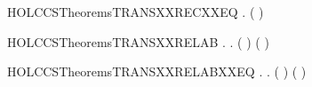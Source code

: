 \newcommand{\HOLCCSTheoremsTRANSXXREC}{\UseVerbatim{HOLCCSTheoremsTRANSXXREC}}
\begin{SaveVerbatim}{HOLCCSTheoremsTRANSXXRECXXEQ}
\HOLTokenTurnstile{} \HOLSymConst{\HOLTokenForall{}}   .    \HOLTokenTransBegin{}\HOLTokenTransEnd {} \HOLSymConst{\HOLTokenEquiv{}}   (  )  \HOLTokenTransBegin{}\HOLTokenTransEnd {}
\end{SaveVerbatim}
\newcommand{\HOLCCSTheoremsTRANSXXRECXXEQ}{\UseVerbatim{HOLCCSTheoremsTRANSXXRECXXEQ}}
\begin{SaveVerbatim}{HOLCCSTheoremsTRANSXXRELAB}
\HOLTokenTurnstile{} \HOLSymConst{\HOLTokenForall{}}   .
          \HOLTokenTransBegin{}\HOLTokenTransEnd {} \HOLSymConst{\HOLTokenImp{}}
       \HOLSymConst{\HOLTokenExists{}} .
           ( \HOLSymConst{=}   ) \HOLSymConst{\HOLTokenConj{}} ( \HOLSymConst{=}   ) \HOLSymConst{\HOLTokenConj{}}
            \HOLTokenTransBegin{}\HOLTokenTransEnd {}
\end{SaveVerbatim}
\newcommand{\HOLCCSTheoremsTRANSXXRELAB}{\UseVerbatim{HOLCCSTheoremsTRANSXXRELAB}}
\begin{SaveVerbatim}{HOLCCSTheoremsTRANSXXRELABXXEQ}
\HOLTokenTurnstile{} \HOLSymConst{\HOLTokenForall{}}   .
          \HOLTokenTransBegin{}\HOLTokenTransEnd {} \HOLSymConst{\HOLTokenEquiv{}}
       \HOLSymConst{\HOLTokenExists{}} .
           ( \HOLSymConst{=}   ) \HOLSymConst{\HOLTokenConj{}} ( \HOLSymConst{=}   ) \HOLSymConst{\HOLTokenConj{}}
            \HOLTokenTransBegin{}\HOLTokenTransEnd {}
\end{SaveVerbatim}
